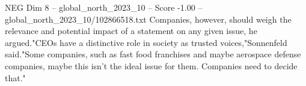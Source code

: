 \begin{textsample}{NEG Dim 8 – global\_north\_2023\_10 – Score -1.00 – global\_north\_2023\_10/102866518.txt}
Companies, however, should weigh the relevance and potential impact of a statement on any given issue, he argued."CEOs have a distinctive role in society as trusted voices,"Sonnenfeld said."Some companies, such as fast food franchises and maybe aerospace defense companies, maybe this isn't the ideal issue for them.
Companies need to decide that."

\end{textsample}
